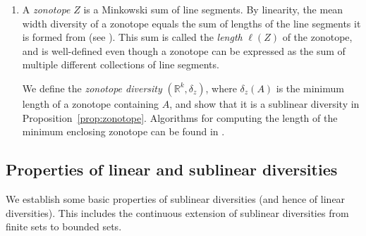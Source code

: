 \documentclass[11pt]{article}
\newcommand{\bbS}{\mathbb{S}}
\renewcommand{\Re}{\mathbb{R}}
\begin{document}
\begin{enumerate}
Let $w_A(x) = \max\{x \cdot (a-b):a,b\in A\}$ denote the width of $A$ in direction $x$, so $w_A(x) = h_{A-A}(x) = h_A(x) + h_A(-x)$. Then 
\[ \delta_w(A) = \frac{1}{\alpha_k} \int_{\bbS^{k-1}} w_A(x) \, \mathrm{d} \nu(x). \]
For $1 \leq p < \infty$ we define
\[ \delta^{(p)}_w(A) = \frac{1}{\alpha_k} \left[\int_{\bbS^{k-1}} |w_A(x)|^p \, \mathrm{d} \nu(x) \right]^{1/p}. \]
That this is a sublinear diversity follows from the Minkowski inequality. See \cite[Prop.~2.4]{HaghmaramNourouzi20}, or \cite[Prop.~10]{BryantCioica-LichtEtal21} in the case that $p=2$. 
\item A {\em zonotope} $Z$ is a Minkowski sum of line segments. By linearity, the mean width diversity of a zonotope equals the sum of lengths of the line segments it is formed from (see \cite{joos2023isoperimetric}). This sum is called the {\em length} $\ell(Z)$ of the zonotope, and is well-defined even though a zonotope can be expressed as the sum of multiple different collections of line segments. 

We define the {\em zonotope diversity} $(\Re^k,\delta_z)$, where $\delta_z(A)$ is the minimum length of a zonotope containing $A$, and show that it is a sublinear diversity in Proposition~\ref{prop:zonotope}. Algorithms for computing the length of the minimum enclosing zonotope can be found in \cite{guibas2003zonotopes}.
\end{enumerate}



\subsection{Properties of linear and sublinear diversities} \label{subsec:properties_of_linear_and_sublin}

We establish some basic properties of sublinear diversities (and hence of linear diversities). This includes  the continuous extension of sublinear diversities from finite sets to bounded sets. 
\end{document}
